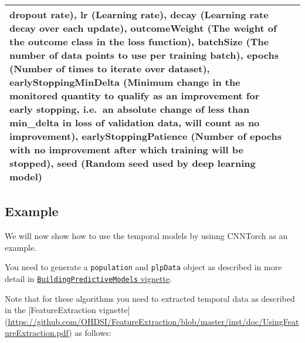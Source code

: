 \documentclass[]{article}
\begin{document}
\begin{longtable}[]{@{}ll@{}}
\begin{minipage}[t]{0.82\columnwidth}
dropout rate), lr (Learning rate), decay (Learning rate decay over each
update), outcomeWeight (The weight of the outcome class in the loss
function), batchSize (The number of data points to use per training
batch), epochs (Number of times to iterate over dataset),
earlyStoppingMinDelta (Minimum change in the monitored quantity to
qualify as an improvement for early stopping, i.e.~an absolute change of
less than min\_delta in loss of validation data, will count as no
improvement), earlyStoppingPatience (Number of epochs with no
improvement after which training will be stopped), seed (Random seed
used by deep learning model)\strut
\end{minipage}\tabularnewline
\bottomrule
\end{longtable}

\subsection{Example}\label{example-1}

We will now show how to use the temporal models by usinng CNNTorch as an
example.

You need to generate a \texttt{population} and \texttt{plpData} object
as described in more detail in
\href{https://github.com/OHDSI/PatientLevelPrediction/blob/master/inst/doc/BuildingPredictiveModels.pdf}{\texttt{BuildingPredictiveModels}
vignette}.

Note that for these algorithms you need to extracted temporal data as
described in the {[}FeatureExtraction vignette{]}
(\url{https://github.com/OHDSI/FeatureExtraction/blob/master/inst/doc/UsingFeatureExtraction.pdf})
as follows:
\end{document}
